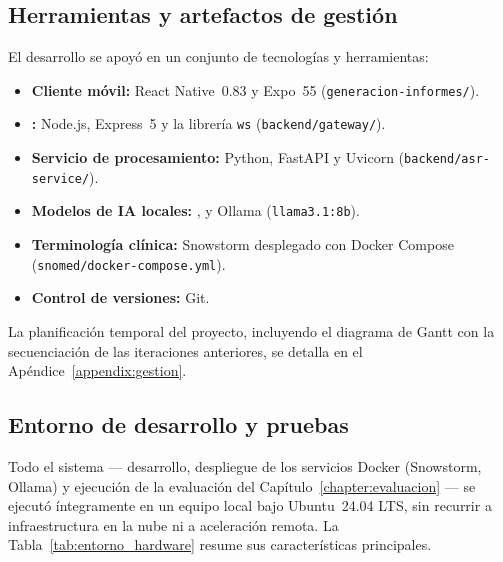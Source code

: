 
\subsection{Herramientas y artefactos de gestión}\label{subsection:herramientas_gestion}

El desarrollo se apoyó en un conjunto de tecnologías y herramientas:

\begin{itemize}
    \item \textbf{Cliente móvil:} React Native~0.83 y Expo~55 (\texttt{generacion-informes/}).
    \item \textbf{:} Node.js, Express~5 y la librería \texttt{ws}
    (\texttt{backend/gateway/}).
    \item \textbf{Servicio de procesamiento:} Python, FastAPI y Uvicorn
    (\texttt{backend/asr-service/}).
    \item \textbf{Modelos de IA locales:} ,  y Ollama (\texttt{llama3.1:8b}).
    \item \textbf{Terminología clínica:} Snowstorm desplegado con Docker Compose
    (\texttt{snomed/docker-compose.yml}).
    \item \textbf{Control de versiones:} Git.
\end{itemize}

La planificación temporal del proyecto, incluyendo el diagrama de Gantt con la secuenciación de las
iteraciones anteriores, se detalla en el Apéndice~\ref{appendix:gestion}.

\subsection{Entorno de desarrollo y pruebas}\label{subsection:entorno_desarrollo}

Todo el sistema --- desarrollo, despliegue de los servicios Docker (Snowstorm, Ollama) y ejecución
de la evaluación del Capítulo~\ref{chapter:evaluacion} --- se ejecutó íntegramente en un equipo local
bajo Ubuntu~24.04 LTS, sin recurrir a infraestructura en la nube ni a aceleración remota. La
Tabla~\ref{tab:entorno_hardware} resume sus características principales.

